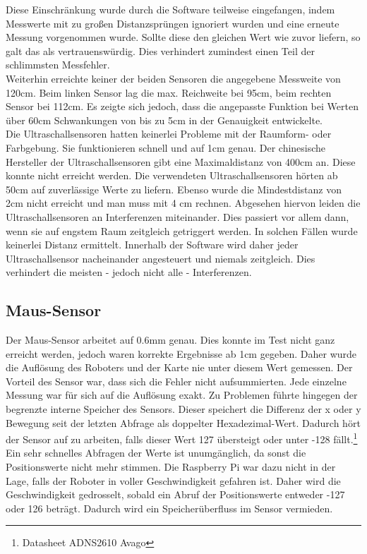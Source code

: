 \documentclass[twoside,12pt,a4paper]{report}
\begin{document}
	Diese Einschränkung wurde durch die Software teilweise eingefangen, indem Messwerte mit zu großen Distanzsprüngen ignoriert wurden und eine erneute Messung vorgenommen wurde. Sollte diese den gleichen Wert wie zuvor liefern, so galt das als vertrauenswürdig. Dies verhindert zumindest einen Teil der schlimmsten Messfehler. \\
	Weiterhin erreichte keiner der beiden Sensoren die angegebene Messweite von 120cm. Beim linken Sensor lag die max. Reichweite bei 95cm, beim rechten Sensor bei 112cm. Es zeigte sich jedoch, dass die angepasste Funktion bei Werten über 60cm Schwankungen von bis zu 5cm in der Genauigkeit entwickelte. \\
	
	Die Ultraschallsensoren hatten keinerlei Probleme mit der Raumform- oder Farbgebung. Sie funktionieren schnell und auf 1cm genau. Der chinesische Hersteller der Ultraschallsensoren gibt eine Maximaldistanz von 400cm an. Diese konnte nicht erreicht werden. Die verwendeten Ultraschallsensoren hörten ab 50cm auf zuverlässige Werte zu liefern. Ebenso wurde die Mindestdistanz von 2cm nicht erreicht und man muss mit 4 cm rechnen. Abgesehen hiervon leiden die Ultraschallsensoren an Interferenzen miteinander. Dies passiert vor allem dann, wenn sie auf engstem Raum zeitgleich getriggert werden. In solchen Fällen wurde keinerlei Distanz ermittelt. Innerhalb der Software wird daher jeder Ultraschallsensor nacheinander angesteuert und niemals zeitgleich. Dies verhindert die meisten - jedoch nicht alle - Interferenzen. 
	
	\subsection{Maus-Sensor}
	Der Maus-Sensor arbeitet auf 0.6mm genau. Dies konnte im Test nicht ganz erreicht werden, jedoch waren korrekte Ergebnisse ab 1cm gegeben. Daher wurde die Auflösung des Roboters und der Karte nie unter diesem Wert gemessen. Der Vorteil des Sensor war, dass sich die Fehler nicht aufsummierten. Jede einzelne Messung war für sich auf die Auflösung exakt. Zu Problemen führte hingegen der begrenzte interne Speicher des Sensors. Dieser speichert die Differenz der x oder y Bewegung seit der letzten Abfrage als doppelter Hexadezimal-Wert. Dadurch hört der Sensor auf zu arbeiten, falls dieser Wert 127 übersteigt oder unter -128 fällt.\footnote{Datasheet ADNS2610 Avago} Ein sehr schnelles Abfragen der Werte ist unumgänglich, da sonst die Positionswerte nicht mehr stimmen. Die Raspberry Pi war dazu nicht in der Lage, falls der Roboter in voller Geschwindigkeit gefahren ist. Daher wird die Geschwindigkeit gedrosselt, sobald ein Abruf der Positionswerte entweder -127 oder 126 beträgt. Dadurch wird ein Speicherüberfluss im Sensor vermieden.  
	
\end{document}
